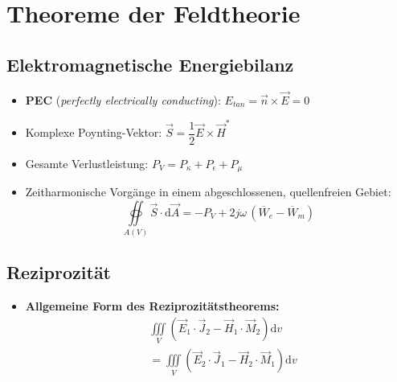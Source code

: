 \vspace{1cm}
{\small%
\section{Theoreme der Feldtheorie}
\subsection{Elektromagnetische Energiebilanz}
\begin{itemize}
    \itemsep0pt
    \item \textbf{PEC} (\textit{perfectly electrically conducting}): \(E_{tan} = \vec{n} \times \vec{E} = 0\)
    \item Komplexe Poynting-Vektor: \(\vec{S} = \dfrac{1}{2} \vec{E} \times \vec{H}^*\)
    \item Gesamte Verlustleistung: \(P_V = P_\kappa + P_\epsilon + P_\mu\)
    \item Zeitharmonische Vorgänge in einem abgeschlossenen, quellenfreien Gebiet:\\
        \[\oiint\limits_{A(V)}\vec{S}\cdot\mathrm{d}\vec{A} = - P_V + 2j\omega\,(\overline{W}_e - \overline{W}_m)\]
\end{itemize}
\subsection{Reziprozität}
\begin{itemize}
    \item \textbf{Allgemeine Form des Reziprozitätstheorems:}\\
        \begin{align*}
            &\iiint\limits_V\left(\vec{E}_1 \cdot \vec{J}_2 - \vec{H}_1 \cdot \vec{M}_2\right)\mathrm{d}v\\
            &= \iiint\limits_V\left(\vec{E}_2 \cdot \vec{J}_1 - \vec{H}_2 \cdot \vec{M}_1\right)\mathrm{d}v
        \end{align*}
\end{itemize}
}
